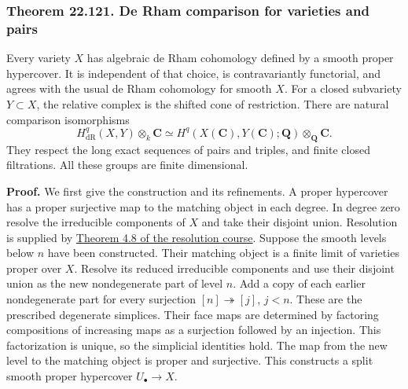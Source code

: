 \documentclass[
  11pt,
  a4paper,
]{article}
\begin{document}
\subsubsection{Theorem 22.121. De Rham comparison for varieties and
pairs}\label{theorem-22.121.-de-rham-comparison-for-varieties-and-pairs}

Every variety \(X\) has algebraic de Rham cohomology defined by a smooth
proper hypercover. It is independent of that choice, is contravariantly
functorial, and agrees with the usual de Rham cohomology for smooth
\(X\). For a closed subvariety \(Y\subset X\), the relative complex is
the shifted cone of restriction. There are natural comparison
isomorphisms \[
 H^q_{\mathrm{dR}}(X,Y)\otimes_k\mathbf C
       \simeq H^q(X(\mathbf C),Y(\mathbf C);\mathbf Q)
                         \otimes_{\mathbf Q}\mathbf C.
 \tag{22.310}
\] They respect the long exact sequences of pairs and triples, and
finite closed filtrations. All these groups are finite dimensional.

\textbf{Proof.} We first give the construction and its refinements. A
proper hypercover has a proper surjective map to the matching object in
each degree. In degree zero resolve the irreducible components of \(X\)
and take their disjoint union. Resolution is supplied by
\href{https://kokunoyumeto.github.io/open-math-courses-public/courses/resolution-of-singularities-in-characteristic-zero/principalization-and-resolution.html\#4-resolution-of-singularities}{Theorem
4.8 of the resolution course}. Suppose the smooth levels below \(n\)
have been constructed. Their matching object is a finite limit of
varieties proper over \(X\). Resolve its reduced irreducible components
and use their disjoint union as the new nondegenerate part of level
\(n\). Add a copy of each earlier nondegenerate part for every
surjection \([n]\twoheadrightarrow[j]\), \(j<n\). These are the
prescribed degenerate simplices. Their face maps are determined by
factoring compositions of increasing maps as a surjection followed by an
injection. This factorization is unique, so the simplicial identities
hold. The map from the new level to the matching object is proper and
surjective. This constructs a split smooth proper hypercover
\(U_\bullet\to X\).
\end{document}
